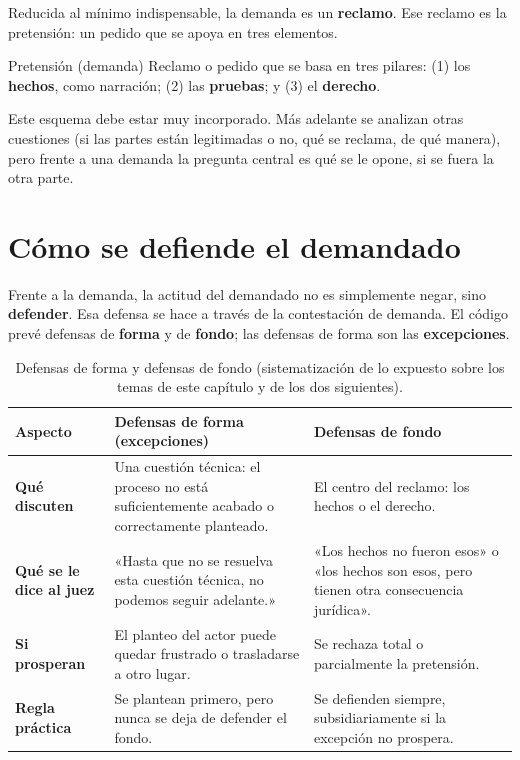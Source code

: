 \documentclass[12pt,oneside]{book}
\begin{document}
Reducida al mínimo indispensable, la demanda es un \textbf{reclamo}. Ese reclamo es la pretensión: un pedido que se apoya en tres elementos.

\begin{definition}{Pretensión (demanda)}
Reclamo o pedido que se basa en tres pilares: (1) los \textbf{hechos}, como narración; (2) las \textbf{pruebas}; y (3) el \textbf{derecho}.
\end{definition}

Este esquema debe estar muy incorporado. Más adelante se analizan otras cuestiones (si las partes están legitimadas o no, qué se reclama, de qué manera), pero frente a una demanda la pregunta central es qué se le opone, si se fuera la otra parte.

\section{Cómo se defiende el demandado}

Frente a la demanda, la actitud del demandado no es simplemente negar, sino \textbf{defender}. Esa defensa se hace a través de la contestación de demanda. El código prevé defensas de \textbf{forma} y de \textbf{fondo}; las defensas de forma son las \textbf{excepciones}.

\begin{table}[H]
\centering
\small
\begin{tabularx}{\textwidth}{>{\raggedright\arraybackslash}p{} >{\raggedright\arraybackslash}X >{\raggedright\arraybackslash}X}
\toprule
\textbf{Aspecto} & \textbf{Defensas de forma (excepciones)} & \textbf{Defensas de fondo} \\
\midrule
\textbf{Qué discuten} & Una cuestión técnica: el proceso no está suficientemente acabado o correctamente planteado. & El centro del reclamo: los hechos o el derecho. \\
\addlinespace
\textbf{Qué se le dice al juez} & «Hasta que no se resuelva esta cuestión técnica, no podemos seguir adelante.» & «Los hechos no fueron esos» o «los hechos son esos, pero tienen otra consecuencia jurídica». \\
\addlinespace
\textbf{Si prosperan} & El planteo del actor puede quedar frustrado o trasladarse a otro lugar. & Se rechaza total o parcialmente la pretensión. \\
\addlinespace
\textbf{Regla práctica} & Se plantean primero, pero nunca se deja de defender el fondo. & Se defienden siempre, subsidiariamente si la excepción no prospera. \\
\bottomrule
\end{tabularx}
\caption{Defensas de forma y defensas de fondo (sistematización de lo expuesto sobre los temas de este capítulo y de los dos siguientes).}
\end{table}
\end{document}
